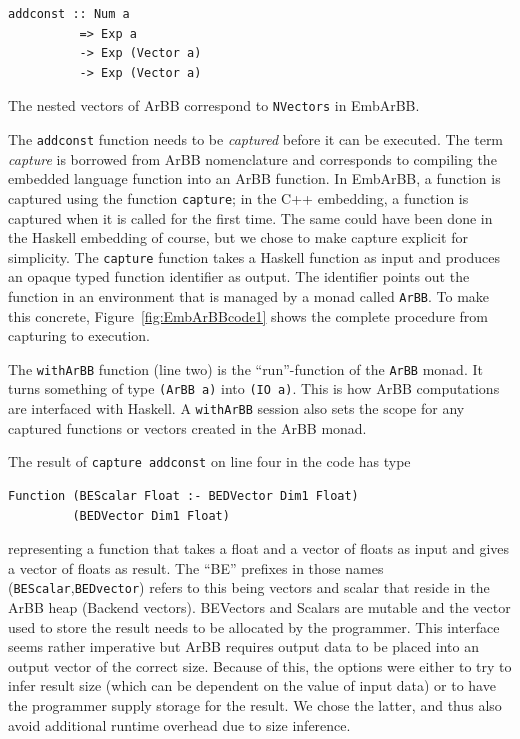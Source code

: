 \begin{verbatim}
addconst :: Num a 
          => Exp a 
          -> Exp (Vector a) 
          -> Exp (Vector a) 
\end{verbatim}

The nested vectors of ArBB correspond to {\tt NVectors} in EmbArBB. 

The {\tt addconst} function needs to be {\em captured} before it can be executed. 
The term {\em capture} is borrowed from ArBB nomenclature and corresponds to compiling 
the embedded language function into an ArBB function. In EmbArBB, a function is 
captured using the function {\tt capture}; in the C++ embedding, a function is 
captured when it is called for the first time. The same could have been done in 
the Haskell embedding of course, but we chose to make
capture explicit for simplicity.
The {\tt capture} function takes a Haskell function as input and produces an 
opaque typed function identifier as output. The identifier points out the function 
in an environment that is managed by a monad called {\tt ArBB}. To make this 
concrete, Figure~\ref{fig:EmbArBBcode1} shows the complete procedure from capturing 
to execution.  

 
The {\tt withArBB} function (line two) is the ``run''-function of the {\tt ArBB} monad. 
It turns something of type {\tt (ArBB a)} into {\tt (IO a)}. This is how ArBB 
computations are interfaced with Haskell. A {\tt withArBB} session also sets the scope 
for any captured functions or vectors created in the ArBB monad.

\pagebreak

The result of {\tt capture addconst} on line four in the code has type 
\begin{verbatim}
Function (BEScalar Float :- BEDVector Dim1 Float) 
         (BEDVector Dim1 Float)
\end{verbatim}
representing a function that takes a float and a vector of floats as 
input and gives a vector of floats as result. The ``BE'' prefixes 
in those names ({\tt BEScalar},{\tt BEDvector}) refers to this being vectors and scalar that 
reside in the ArBB heap (Backend vectors). BEVectors and Scalars are mutable and the 
vector used to store the result needs to be allocated by the programmer. This interface 
seems rather imperative but ArBB requires output data to be
placed into an output vector of the correct size. 
Because of this, the options were either to try to infer result size (which can be dependent on the value of input data) or to have the programmer
supply storage for the result. We chose the latter, and thus also avoid
additional runtime overhead due to size inference.

